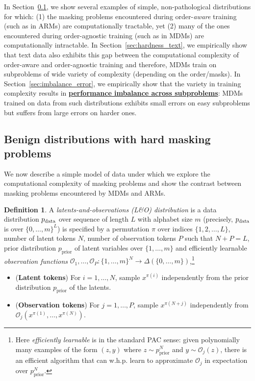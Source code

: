 \documentclass{article}
\newcommand{\prior}{p_{\textrm{prior}}}
\theoremstyle{plain}
\theoremstyle{definition}
\newtheorem{definition}[theorem]{Definition}
\theoremstyle{remark}
\newcounter{theo}
\begin{document}
In Section~\ref{sec:csp}, we show several examples of simple, non-pathological distributions for which: (1) the masking problems encountered during order-\emph{aware} training (such as in ARMs) are computationally tractable, yet (2) many of the ones encountered during order-agnostic training (such as in MDMs) are computationally intractable. In Section~\ref{sec:hardness_text}, we empirically show that text data also exhibits this gap between the computational complexity of order-aware and order-agnostic training and therefore, MDMs train on subproblems of wide variety of complexity (depending on the order/masks). In Section~\ref{sec:imbalance_error}, we empirically show that the variety in training complexity results in \underline{\textbf{performance imbalance across subproblems}}: MDMs trained on data from such distributions exhibits small errors on easy subproblems but suffers from large errors on harder ones.

\subsection{Benign distributions with hard masking problems} \label{sec:csp}

We now describe a simple model of data under which we explore the computational complexity of masking problems and show the contrast between masking problems encountered by MDMs and ARMs. 

\begin{definition}\label{definition:planted}
    A \emph{latents-and-observations (L\&O) distribution} is a data distribution $p_{\rm data}$ over sequence of length $L$ with alphabet size $m$ (precisely, $p_{\rm data}$ is over $\{0,\ldots,m\}^L$)  is specified by a permutation $\pi$ over indices $\{1, 2, \ldots, L \}$, number of latent tokens $N$, number of observation tokens $P$ such that $N + P = L$, prior distribution $\prior$ of latent variables over $\{1,\ldots,m\}$ and efficiently learnable \emph{observation functions} $\mathcal{O}_1,\ldots,\mathcal{O}_P: \{1,\ldots,m\}^N \to \Delta(\{0,\ldots,m\})$,\footnote{Here \emph{efficiently learnable} is in the standard PAC sense: given polynomially many examples of the form $(z,y)$ where $z\sim \prior^N$ and $y\sim \mathcal{O}_j(z)$, there is an efficient algorithm that can w.h.p. learn to approximate $\mathcal{O}_j$ in expectation over $\prior^N$.} 
    \begin{itemize}[topsep=0pt,itemsep=0pt,leftmargin=*]
        \item (\textbf{Latent tokens}) For $i = 1,\ldots,N$, sample $x^{\pi(i)}$ 
        independently from the prior distribution $\prior$ of the latents.
        \item (\textbf{Observation tokens}) For $j = 1,\ldots,P$, sample $x^{\pi(N + j)}$ independently from $\mathcal{O}_j(x^{\pi(1)},\ldots,x^{\pi(N)})$.
    \end{itemize} 
\end{definition}
\end{document}
